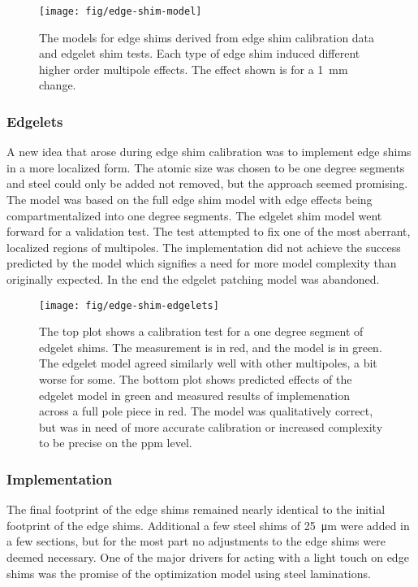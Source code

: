 \begin{figure}
\centering
\texttt{[image: fig/edge-shim-model]}
\caption{
    The models for edge shims derived from edge shim calibration data and edgelet shim tests.  Each type of edge shim induced different higher order multipole effects.  The effect shown is for a \SI{1}{\milli\meter} change. 
    \label{fig:edge-shim-model}
}
\end{figure}

\subsubsection{Edgelets}

A new idea that arose during edge shim calibration was to implement edge shims in a more localized form.  The atomic size was chosen to be one degree segments and steel could only be added not removed, but the approach seemed promising.  The model was based on the full edge shim model with edge effects being compartmentalized into one degree segments.  The edgelet shim model went forward for a validation test.  The test attempted to fix one of the most aberrant, localized regions of multipoles.  The implementation did not achieve the success predicted by the model which signifies a need for more model complexity than originally expected. In the end the edgelet patching model was abandoned.

\begin{figure}
\centering
\texttt{[image: fig/edge-shim-edgelets]}
\caption{
    The top plot shows a calibration test for a one degree segment of edgelet shims.  The measurement is in red, and the model is in green. The edgelet model agreed similarly well with other multipoles, a bit worse for some.  The bottom plot shows predicted effects of the edgelet model in green and measured results of  implemenation across a full pole piece in red.  The model was qualitatively correct, but was in need of more accurate calibration or increased complexity to be precise on the ppm level. 
    \label{fig:edge-shim-edgelets}
}
\end{figure}

\subsubsection{Implementation}

The final footprint of the edge shims remained nearly identical to the initial footprint of the edge shims.  Additional a few steel shims of \SI{25}{\micro \meter} were added in a few sections, but for the most part no adjustments to the edge shims were deemed necessary.  One of the major drivers for acting with a light touch on edge shims was the promise of the optimization model using steel laminations.

